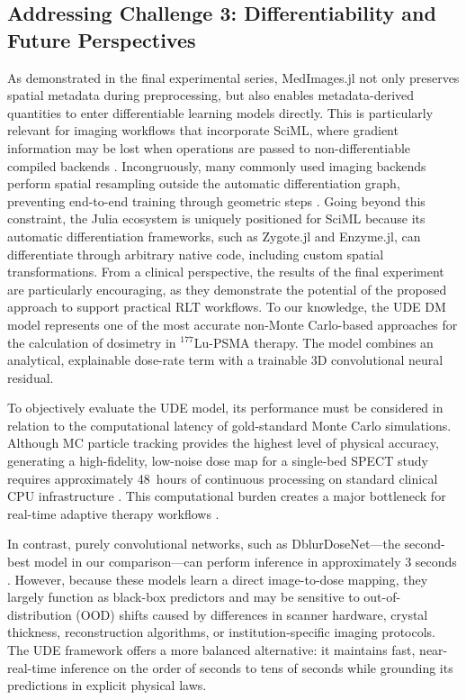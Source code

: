 \documentclass[a4paper,10pt,preprint]{elsarticle}
\begin{document}
\subsection*{Addressing Challenge 3: Differentiability and Future Perspectives}

As demonstrated in the final experimental series, MedImages.jl not only preserves spatial metadata during preprocessing, but also enables metadata-derived quantities to enter differentiable learning models directly. This is particularly relevant for imaging workflows that incorporate SciML, where gradient information may be lost when operations are passed to non-differentiable compiled backends \cite{Holl,zhang2025gradientfree}. 
Incongruously, many commonly used imaging backends perform spatial resampling outside the automatic differentiation graph, preventing end-to-end training through geometric steps \cite{Berman_2024}. Going beyond this constraint, the Julia ecosystem is uniquely positioned for SciML because its automatic differentiation frameworks, such as Zygote.jl and Enzyme.jl, can differentiate through arbitrary native code, including custom spatial transformations.  
From a clinical perspective, the results of the final experiment are particularly encouraging, as they demonstrate the potential of the proposed approach to support practical RLT workflows. To our knowledge, the UDE DM model represents one of the most accurate non-Monte Carlo-based approaches for the calculation of dosimetry in $^{177}$Lu-PSMA therapy. The model combines an analytical, explainable dose-rate term with a trainable 3D convolutional neural residual.

To objectively evaluate the UDE model, its performance must be considered in relation to the computational latency of gold-standard Monte Carlo simulations. Although MC particle tracking provides the highest level of physical accuracy, generating a high-fidelity, low-noise dose map for a single-bed SPECT study requires approximately 48~hours of continuous processing on standard clinical CPU infrastructure \cite{KimSuh2024}. This computational burden creates a major bottleneck for real-time adaptive therapy workflows \cite{VolpePiscopo2023}.

In contrast, purely convolutional networks, such as DblurDoseNet—the second-best model in our comparison—can perform inference in approximately 3 seconds \cite{LiFessler2021}. However, because these models learn a direct image-to-dose mapping, they largely function as black-box predictors and may be sensitive to out-of-distribution (OOD) shifts caused by differences in scanner hardware, crystal thickness, reconstruction algorithms, or institution-specific imaging protocols. The UDE framework offers a more balanced alternative: it maintains fast, near-real-time inference on the order of seconds to tens of seconds while grounding its predictions in explicit physical laws.
\end{document}
